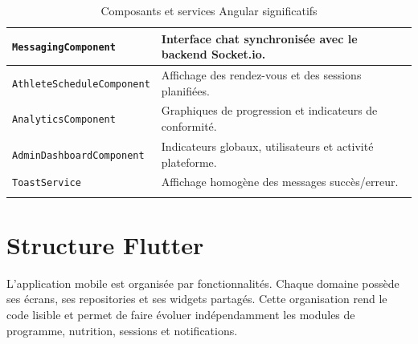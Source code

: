 \begin{longtable}{|p{4cm}|p{11cm}|}
\texttt{MessagingComponent} & Interface chat synchronisée avec le backend Socket.io. \\ \hline
\texttt{AthleteScheduleComponent} & Affichage des rendez-vous et des sessions planifiées. \\ \hline
\texttt{AnalyticsComponent} & Graphiques de progression et indicateurs de conformité. \\ \hline
\texttt{AdminDashboardComponent} & Indicateurs globaux, utilisateurs et activité plateforme. \\ \hline
\texttt{ToastService} & Affichage homogène des messages succès/erreur. \\ \hline
\caption{Composants et services Angular significatifs}
\end{longtable}

\section{Structure Flutter}
L'application mobile est organisée par fonctionnalités. Chaque domaine possède ses écrans, ses repositories et ses widgets partagés. Cette organisation rend le code lisible et permet de faire évoluer indépendamment les modules de programme, nutrition, sessions et notifications.

